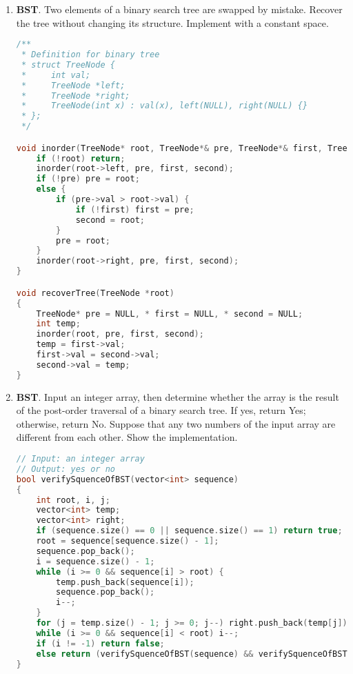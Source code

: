 \documentclass[12pt,a4paper]{article}
\makeatletter
\newtheorem*{solution}{Solution}
\theoremstyle{definition}
\renewenvironment{solution}[1][Solution] {\par\pushQED{\qed}\normalfont\topsep6\p@\@plus6\p@\relax\trivlist\item[\hskip\labelsep\bfseries#1\@addpunct{.}]\ignorespaces}{\popQED\endtrivlist\@endpefalse} \makeatother
\makeatother
\begin{document}
\begin{enumerate}
\item  \textbf{BST}. Two elements of a binary search tree are swapped by mistake. Recover the tree without changing its structure. Implement with a constant space.

\begin{lstlisting}[language=C++]
/**
 * Definition for binary tree
 * struct TreeNode {
 *     int val;
 *     TreeNode *left;
 *     TreeNode *right;
 *     TreeNode(int x) : val(x), left(NULL), right(NULL) {}
 * };
 */

void inorder(TreeNode* root, TreeNode*& pre, TreeNode*& first, TreeNode*& second) {
	if (!root) return;
	inorder(root->left, pre, first, second);
	if (!pre) pre = root;
	else {
		if (pre->val > root->val) {
			if (!first) first = pre;
			second = root;
		}
		pre = root;
	}
	inorder(root->right, pre, first, second);
} 

void recoverTree(TreeNode *root)
{
	TreeNode* pre = NULL, * first = NULL, * second = NULL;
	int temp;
	inorder(root, pre, first, second);
	temp = first->val;
	first->val = second->val;
	second->val = temp;
}
\end{lstlisting}


\item  \textbf{BST}. Input an integer array, then determine whether the array is the result of the post-order traversal of a binary search tree. If yes, return Yes; otherwise, return No. Suppose that any two numbers of the input array are different from each other. Show the implementation.

\begin{lstlisting}[language=C++]
// Input: an integer array
// Output: yes or no
bool verifySquenceOfBST(vector<int> sequence)
{
	int root, i, j;
	vector<int> temp;
	vector<int> right;
	if (sequence.size() == 0 || sequence.size() == 1) return true;
	root = sequence[sequence.size() - 1];
	sequence.pop_back();
	i = sequence.size() - 1;
	while (i >= 0 && sequence[i] > root) {
		temp.push_back(sequence[i]);
		sequence.pop_back();
		i--;
	}
	for (j = temp.size() - 1; j >= 0; j--) right.push_back(temp[j]);
	while (i >= 0 && sequence[i] < root) i--;
	if (i != -1) return false;
	else return (verifySquenceOfBST(sequence) && verifySquenceOfBST(right));
}
\end{lstlisting}


\end{enumerate}

\end{document}
